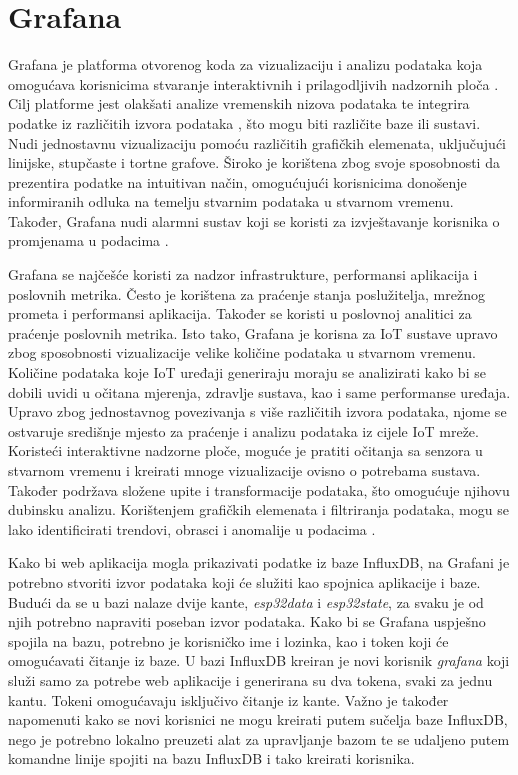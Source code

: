 \section{Grafana}

Grafana je platforma otvorenog koda za vizualizaciju i analizu podataka koja omogućava korisnicima stvaranje interaktivnih i prilagodljivih nadzornih ploča . Cilj platforme jest olakšati analize vremenskih nizova podataka te integrira podatke iz različitih izvora podataka , što mogu biti različite baze ili sustavi. Nudi jednostavnu vizualizaciju pomoću različitih grafičkih elemenata, uključujući linijske, stupčaste i tortne grafove. Široko je korištena zbog svoje sposobnosti da prezentira podatke na intuitivan način, omogućujući korisnicima donošenje informiranih odluka na temelju stvarnim podataka u stvarnom vremenu. Također, Grafana nudi alarmni sustav koji se koristi za izvještavanje korisnika o promjenama u podacima \cite{grafana}. 

Grafana se najčešće koristi za nadzor infrastrukture, performansi aplikacija i poslovnih metrika. Često je korištena za praćenje stanja poslužitelja, mrežnog prometa i performansi aplikacija. Također se koristi u poslovnoj analitici za praćenje poslovnih metrika. Isto tako, Grafana je korisna za IoT sustave upravo zbog sposobnosti vizualizacije velike količine podataka u stvarnom vremenu. Količine podataka koje IoT uređaji generiraju moraju se analizirati kako bi se dobili uvidi u očitana mjerenja, zdravlje sustava, kao i same performanse uređaja. Upravo zbog jednostavnog povezivanja s više različitih izvora podataka, njome se ostvaruje središnje mjesto za praćenje i analizu podataka iz cijele IoT mreže. Koristeći interaktivne nadzorne ploče, moguće je pratiti očitanja sa senzora u stvarnom vremenu i kreirati mnoge vizualizacije ovisno o potrebama sustava. Također podržava složene upite i transformacije podataka, što omogućuje njihovu dubinsku analizu. Korištenjem grafičkih elemenata i filtriranja podataka, mogu se lako identificirati trendovi, obrasci i anomalije u podacima \cite{grafana_iot}.

Kako bi web aplikacija mogla prikazivati podatke iz baze InfluxDB, na Grafani je potrebno stvoriti izvor podataka koji će služiti kao spojnica aplikacije i baze. Budući da se u bazi nalaze dvije kante, \textit{esp32data} i \textit{esp32state}, za svaku je od njih potrebno napraviti poseban izvor podataka. Kako bi se Grafana uspješno spojila na bazu, potrebno je korisničko ime i lozinka, kao i token koji će omogućavati čitanje iz baze. U bazi InfluxDB kreiran je novi korisnik \textit{grafana} koji služi samo za potrebe web aplikacije i generirana su dva tokena, svaki za jednu kantu. Tokeni omogućavaju isključivo čitanje iz kante. Važno je također napomenuti kako se novi korisnici ne mogu kreirati putem sučelja baze InfluxDB, nego je potrebno lokalno preuzeti alat za upravljanje bazom te se udaljeno putem komandne linije spojiti na bazu InfluxDB i tako kreirati korisnika.

